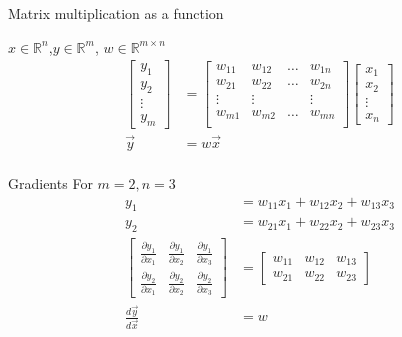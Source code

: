 \begin{frame}{Matrix multiplication as a function}
		\begin{block}{$x \in \mathbb{R}^n$,$y \in \mathbb{R}^m$, $w\in \mathbb{R}^{m \times n}$}
			\begin{align*}
				\begin{bmatrix}
					y_1 \\
					y_2 \\
					\vdots \\
					y_m
				\end{bmatrix} & =  
				\begin{bmatrix}
					w_{11} & w_{12}& \dots & w_{1n}  \\
					w_{21} & w_{22}& \dots & w_{2n}  \\
					\vdots &\vdots &  & \vdots  \\
					w_{m1} & w_{m2}& \dots & w_{mn}  \\
				\end{bmatrix}
			\begin{bmatrix}
				x_1 \\
				x_2 \\
				\vdots \\
				x_n
			\end{bmatrix} \\
		\vec{y} &=w\vec{x} \\
			\end{align*}

		\end{block}
\end{frame}
\begin{frame}{Gradients}
	For $m=2, n=3$
	\begin{align}
		y_1 &= w_{11}x_1 + w_{12}x_2+w_{13}x_3  \\
		y_2 &= w_{21}x_1 + w_{22}x_2+w_{23}x_3  \\ 
		\begin{bmatrix}
			\frac{\partial y_1}{\partial x_1} & 
				\frac{\partial y_1}{\partial x_2}& 
				\frac{\partial y_1}{\partial x_3}  \\
			\frac{\partial y_2}{\partial x_1}  & 
				\frac{\partial y_2}{\partial x_2}  & 
				\frac{\partial y_2}{\partial x_3}  
		\end{bmatrix} &= 
		\begin{bmatrix}
			w_{11} &  w_{12} & 	w_{13} \\
			w_{21} &  w_{22} & 	w_{23} 
		\end{bmatrix} \\
		\frac{d\vec{y}}{d\vec{x}} &=w 
	\end{align}
\end{frame}
